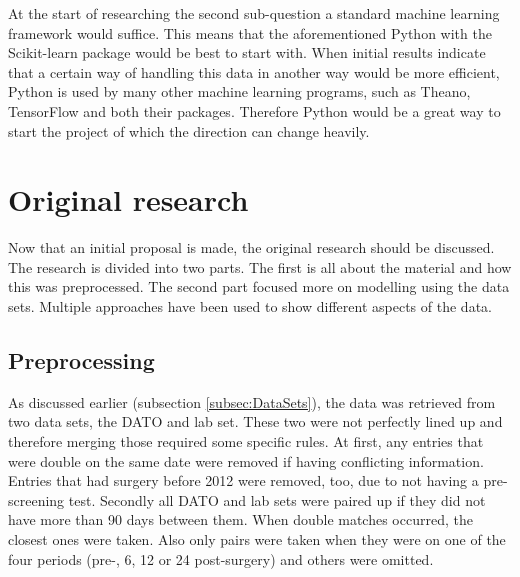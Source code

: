 \documentclass[10pt,a4paper]{article}
\begin{document}
	At the start of researching the second sub-question a standard machine learning framework would suffice. This means that the aforementioned Python with the Scikit-learn package would be best to start with. When initial results indicate that a certain way of handling this data in another way would be more efficient, Python is used by many other machine learning programs, such as Theano, TensorFlow and both their packages. Therefore Python would be a great way to start the project of which the direction can change heavily.
	
	\clearpage
	
	\section{Original research}
	\label{sec:OriginalResearch}
	
	Now that an initial proposal is made, the original research should be discussed. The research is divided into two parts. The first is all about the material and how this was preprocessed. The second part focused more on modelling using the data sets. Multiple approaches have been used to show different aspects of the data.
	
	\subsection{Preprocessing}
	\label{subsec:Preprocessing}
	
	As discussed earlier (subsection \ref{subsec:DataSets}), the data was retrieved from two data sets, the DATO and lab set. These two were not perfectly lined up and therefore merging those required some specific rules. At first, any entries that were double on the same date were removed if having conflicting information. Entries that had surgery before 2012 were removed, too, due to not having a pre-screening test. Secondly all DATO and lab sets were paired up if they did not have more than 90 days between them. When double matches occurred, the closest ones were taken. Also only pairs were taken when they were on one of the four periods (pre-, 6, 12 or 24 post-surgery) and others were omitted.
	
\end{document}
